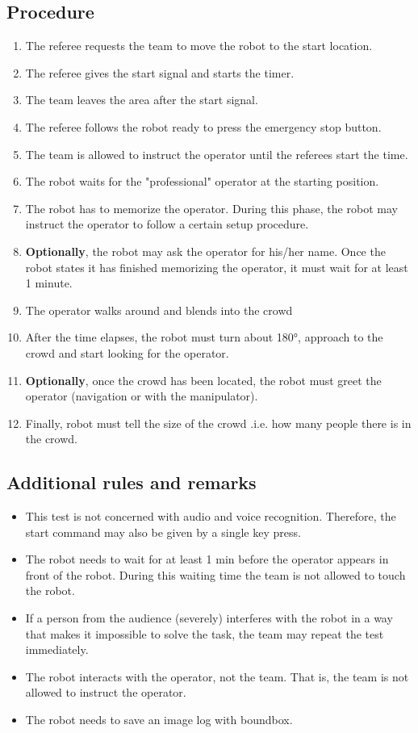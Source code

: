 \subsection*{Procedure}
	\begin{enumerate}[nosep]
		\item The referee requests the team to move the robot to the start location.
		\item The referee gives the start signal and starts the timer.
		\item The team leaves the area after the start signal.		
		\item The referee follows the robot ready to press the emergency stop button.
		
		\item The team is allowed to instruct the operator until the referees start the time.
		\item The robot waits for the "professional" operator at the starting position.
		\item The robot has to memorize the operator. During this phase, the robot may instruct the operator to follow a certain setup procedure.
		\item \textbf{Optionally}, the robot may ask the operator for his/her name.
		Once the robot states it has finished memorizing the operator, it must wait for at least 1 minute.
		\item The operator walks around and blends into the crowd
		\item After the time elapses, the robot must turn about 180°, approach to the crowd and start looking for the operator.
		\item \textbf{Optionally}, once the crowd has been located, the robot must greet the operator (navigation or with the manipulator).
		\item Finally, robot must tell the size of the crowd .i.e. how many people there is in the crowd.
		

	\end{enumerate}

\subsection*{Additional rules and remarks}
\begin{itemize}[nosep]
	\item This test is not concerned with audio and voice recognition. Therefore, the start command may also be given by a single key press.
	\item The robot needs to wait for at least 1 min before the operator appears in front of the robot. During this waiting time the team is not allowed to touch the robot.
	\item If a person from the audience (severely) interferes with the robot in a way that makes it impossible to solve the task, the team may repeat the test immediately.
	\item The robot interacts with the operator, not the team. That is, the team is not allowed to instruct the operator.
    \item The robot needs to save an image log with boundbox.
\end{itemize}

